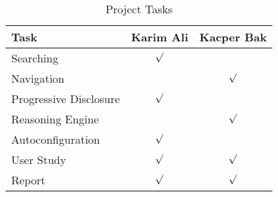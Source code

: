 \documentclass{chi2009}
\newcommand{\todo}[1]{\textsf{\textbf{\textcolor{Orange}{[[#1]]}}}}
\begin{document}
\begin{table}[!h]
\centering
\begin{tabularx}{0.5\textwidth}{X c c}
\toprule
\textbf{Task} & \textbf{Karim Ali} & \textbf{Kacper Bak}\\ \midrule
Searching & $\surd$ &\\
Navigation & & $\surd$\\
Progressive Disclosure & $\surd$ &\\
Reasoning Engine & & $\surd$\\
Autoconfiguration & $\surd$ &\\
User Study & $\surd$ & $\surd$\\
Report & $\surd$ & $\surd$\\
\bottomrule
\end{tabularx}
\caption{Project Tasks}
\label{tab:plan}
\end{table}




\end{document}
